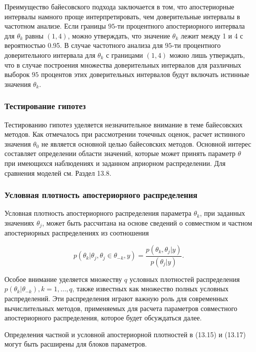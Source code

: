 Преимущество байесовского подхода заключается в том, что апостериорные интервалы намного проще интерпретировать, чем доверительные интервалы в частотном анализе. Если границы $95$-ти процентного апостериорного интервала для $\theta_k$ равны $(1,4)$, можно утверждать, что значение $\theta_k$ лежит между 1 и 4 с вероятностью 0.95. В случае частотного анализа для $95$-ти процентного доверительного интервала для $\theta_k$ с границами $(1,4)$ можно лишь утверждать, что в случае построения множества доверительных интервалов для различных выборок $95$ процентов этих доверительных интервалов будут включать истинные значения $\theta_k$.

\subsubsection*{Тестирование гипотез}

Тестированию гипотез уделяется незначительное внимание в теме байесовских методов. Как отмечалось при рассмотрении точечных оценок, расчет истинного значения $\theta_0$ не является основной целью байесовских методов. Основной интерес составляет определении области значений, которые может принять параметр $\theta$ при имеющихся наблюдениях и заданном априорном распределении. Для сравнения моделей см. Раздел 13.8.

\subsubsection*{Условная плотность апостериорного распределения}

Условная плотность апостериорного распределения параметра $\theta_k$, при заданных значениях $\theta_j$, может быть рассчитана на основе сведений о совместном и частном апостериорных распределениях из соотношения

\begin{equation}
p(\theta_k|\theta_j,\theta_j \in \theta_{-k},y)=\dfrac{p(\theta_k,\theta_j|y)}{p(\theta_j|y)}.
\end{equation}

Особое внимание уделяется множеству $q$ условных плотностей распределения $p(\theta_k|\theta_{-k}), k=1,\ldots ,q$, также известных как множество полных условных распределений. Эти распределения играют важную роль для современных вычислительных методов, применяемых для расчета параметров совместного апостериорного распределения, которое будет обсуждаться далее.

Определения частной и условной апостериорной плотностей в (13.15) и (13.17) могут быть расширены для блоков параметров. 

